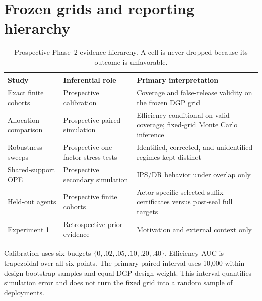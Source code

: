 \documentclass{article}
\begin{document}
\section{Frozen grids and reporting hierarchy}
\label{app:grids}

\begin{table}[h]
\caption{Prospective Phase~2 evidence hierarchy. A cell is never dropped because its outcome is
unfavorable.}
\centering
\small
\begin{tabularx}{\linewidth}{l l X}
\toprule
Study & Inferential role & Primary interpretation \\
\midrule
Exact finite cohorts & Prospective calibration & Coverage and false-release validity on the frozen
DGP grid \\
Allocation comparison & Prospective paired simulation & Efficiency conditional on valid coverage;
fixed-grid Monte Carlo inference \\
Robustness sweeps & Prospective one-factor stress tests & Identified, corrected, and unidentified
regimes kept distinct \\
Shared-support OPE & Prospective secondary simulation & IPS/DR behavior under overlap only \\
Held-out agents & Prospective finite cohorts & Actor-specific selected-suffix certificates versus
post-seal full targets \\
Experiment 1 & Retrospective prior evidence & Motivation and external context only \\
\bottomrule
\end{tabularx}
\end{table}

Calibration uses six budgets $\{0,.02,.05,.10,.20,.40\}$. Efficiency AUC is trapezoidal over all
six points. The primary paired interval uses 10,000 within-design bootstrap samples and equal DGP
design weight. This interval quantifies simulation error and does not turn the fixed grid into a
random sample of deployments.
\end{document}
